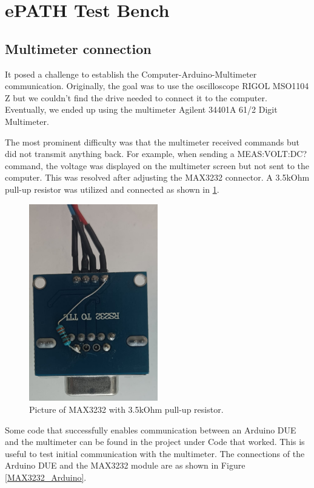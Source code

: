 \section{ePATH Test Bench}

\subsection{Multimeter connection}
It posed a challenge to establish the Computer-Arduino-Multimeter communication. Originally, the goal was to use the oscilloscope RIGOL MSO1104 Z but we couldn't find the drive needed to connect it to the computer. Eventually, we ended up using the multimeter Agilent 34401A 61/2 Digit Multimeter\cite{keysight34401A}. 

The most prominent difficulty was that the multimeter received commands but did not transmit anything back. For example, when sending a MEAS:VOLT:DC? command, the voltage was displayed on the multimeter screen but not sent to the computer. This was resolved after adjusting the MAX3232 connector. A 3.5kOhm pull-up resistor was utilized and connected as shown in \ref{MAX3232}.

\begin{figure}[H]
          \centering
          \includegraphics[angle=90, width=0.5\textwidth]{img/RS232_connector.jpeg}
          \caption{Picture of MAX3232 with 3.5kOhm pull-up resistor.}
          \label{MAX3232}
    \end{figure}

Some code that successfully enables communication between an Arduino DUE and the multimeter can be found in the project under Code that worked. This is useful to test initial communication with the multimeter. The connections of the Arduino DUE and the MAX3232 module are as shown in Figure \ref{MAX3232_Arduino}.

